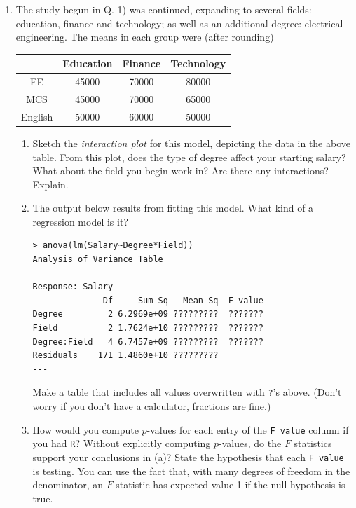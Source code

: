\documentclass{article}
\begin{document}
\begin{enumerate}
\item 
The study begun in Q. 1) was continued, expanding to several fields:
education, finance and technology; as well as an additional
degree: electrical engineering.   The means in each group were (after rounding)
\begin{center}
\begin{tabular}{|c|c|c|c|} \hline 
& Education & Finance & Technology \\ \hline
EE & 45000 & 70000 & 80000 \\
MCS & 45000 & 70000 & 65000 \\
English & 50000 & 60000 & 50000 \\ \hline
\end{tabular}
\end{center}

\begin{enumerate}
\item Sketch the {\em interaction plot} for this model, depicting the data in the above table.
From this plot, does the type of degree affect your starting salary? What about the field you begin work in? Are there any interactions? Explain.


\newpage

\item The output below results from fitting this model. What kind of a regression model is it?
\begin{verbatim}
> anova(lm(Salary~Degree*Field))
Analysis of Variance Table

Response: Salary
              Df     Sum Sq   Mean Sq  F value
Degree         2 6.2969e+09 ?????????  ???????
Field          2 1.7624e+10 ?????????  ???????
Degree:Field   4 6.7457e+09 ?????????  ???????
Residuals    171 1.4860e+10 ?????????
---

\end{verbatim}
Make a table that includes all values overwritten with {\tt ?}'s above.
({\sc Don't worry if you don't have a calculator, fractions are fine.}) 


\newpage 
\item How would you compute $p$-values for each entry of the {\tt F value} column if you had {\tt R}? Without explicitly computing $p$-values, do the $F$ statistics support your conclusions in (a)? State the hypothesis that each {\tt F value} is testing. {\sc You can use the fact that, with many degrees of freedom in the denominator, an $F$ statistic has expected value 1 if the null hypothesis is true.}

\end{enumerate}



\end{enumerate}
\end{document}
